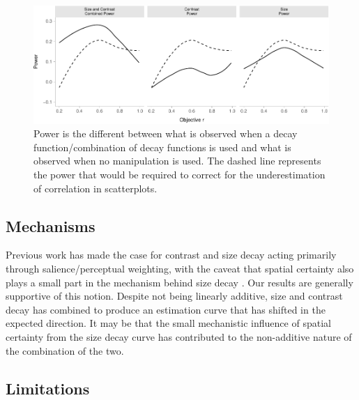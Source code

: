 \documentclass[manuscript, review, anonymous, screen]{acmart}
\begin{document}
\begin{figure}

{\centering \includegraphics[width=1\textwidth,height=\textheight]{size_and_contrast_new_files/figure-pdf/fig-power-plot-1.pdf}

}

\caption{\label{fig-power-plot}Power is the different between what is
observed when a decay function/combination of decay functions is used
and what is observed when no manipulation is used. The dashed line
represents the power that would be required to correct for the
underestimation of correlation in scatterplots.}

\end{figure}

\hypertarget{sec-mechs}{%
\subsection{Mechanisms}\label{sec-mechs}}

Previous work has made the case for contrast and size decay acting
primarily through salience/perceptual weighting, with the caveat that
spatial certainty also plays a small part in the mechanism behind size
decay \citep{strain_2023, strain_2023b}. Our results are generally
supportive of this notion. Despite not being linearly additive, size and
contrast decay has combined to produce an estimation curve that has
shifted in the expected direction. It may be that the small mechanistic
influence of spatial certainty from the size decay curve has contributed
to the non-additive nature of the combination of the two.

\hypertarget{sec-limitations}{%
\subsection{Limitations}\label{sec-limitations}}
\end{document}
